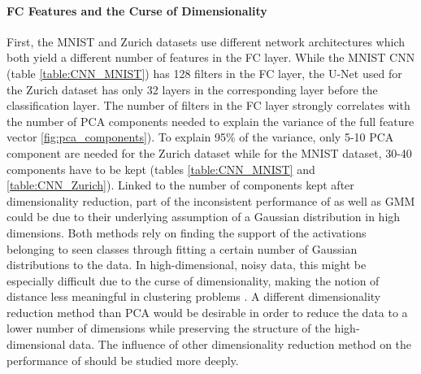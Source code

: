 \documentclass[10pt]{article}
\begin{document}
\paragraph{\gls{FC} Features and the Curse of Dimensionality}  First, the MNIST and Zurich datasets use different network architectures which both yield a different number of features in the \gls{FC} layer. While the \gls{MNIST} \gls{CNN} (table \ref{table:CNN_MNIST}) has 128 filters in the \gls{FC} layer, the U-Net used for the Zurich dataset has only 32 layers in the corresponding layer before the classification layer. The number of filters in the \gls{FC} layer strongly correlates with the number of \gls{PCA} components needed to explain the variance of the full feature vector \ref{fig:pca_components}). To explain 95\% of the variance, only 5-10 \gls{PCA} component are needed for the Zurich dataset while for the \gls{MNIST} dataset, 30-40 components have to be kept (tables \ref{table:CNN_MNIST} and \ref{table:CNN_Zurich}). Linked to the number of components kept after dimensionality reduction, part of the inconsistent performance of  as well as \gls{GMM} could be due to their underlying assumption of a Gaussian distribution in high dimensions. Both methods rely on finding the support of the activations belonging to seen classes through fitting a certain number of Gaussian distributions to the data. In high-dimensional, noisy data, this might be especially difficult due to the curse of dimensionality, making the notion of distance less meaningful in clustering problems \cite{Hinneburg2000WhatIT}. A different dimensionality reduction method than \gls{PCA} would be desirable in order to reduce the data to a lower number of dimensions while preserving the structure of the high-dimensional data. The influence of other dimensionality reduction method on the performance of  should be studied more deeply.

\end{document}
